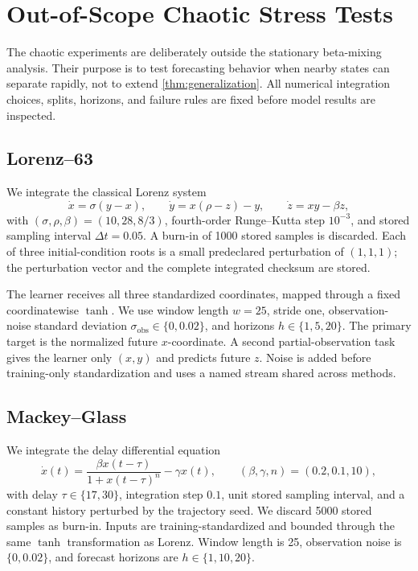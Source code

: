 \section{Out-of-Scope Chaotic Stress Tests}
\label{app:chaotic-stress}

The chaotic experiments are deliberately outside the stationary beta-mixing
analysis.  Their purpose is to test forecasting behavior when nearby states can
separate rapidly, not to extend \cref{thm:generalization}.  All numerical
integration choices, splits, horizons, and failure rules are fixed before
model results are inspected.

\subsection{Lorenz--63}
\label{app:lorenz63}

We integrate the classical Lorenz system \citep{Lorenz1963}
\begin{equation}
 \dot x=\sigma(y-x),\qquad
 \dot y=x(\rho-z)-y,\qquad
 \dot z=xy-\beta z,
 \label{eq:lorenz63}
\end{equation}
with \((\sigma,\rho,\beta)=(10,28,8/3)\), fourth-order Runge--Kutta step
\(10^{-3}\), and stored sampling interval \(\Delta t=0.05\).  A burn-in of
1000 stored samples is discarded.  Each of three initial-condition roots is a
small predeclared perturbation of \((1,1,1)\); the perturbation vector and the
complete integrated checksum are stored.

The learner receives all three standardized coordinates, mapped through a
fixed coordinatewise \(\tanh\).  We use window length \(w=25\), stride one,
observation-noise standard deviation \(\sigma_{\mathrm{obs}}\in\{0,0.02\}\),
and horizons \(h\in\{1,5,20\}\).  The primary target is the normalized future
\(x\)-coordinate.  A second partial-observation task gives the learner only
\((x,y)\) and predicts future \(z\).  Noise is added before training-only
standardization and uses a named stream shared across methods.

\subsection{Mackey--Glass}
\label{app:mackey-glass}

We integrate the delay differential equation \citep{MackeyGlass1977}
\begin{equation}
 \dot x(t)=\frac{\beta x(t-\tau)}{1+x(t-\tau)^n}-\gamma x(t),
 \qquad (\beta,\gamma,n)=(0.2,0.1,10),
 \label{eq:mackey-glass}
\end{equation}
with delay \(\tau\in\{17,30\}\), integration step \(0.1\), unit stored sampling
interval, and a constant history perturbed by the trajectory seed.  We discard
5000 stored samples as burn-in.  Inputs are training-standardized and bounded
through the same \(\tanh\) transformation as Lorenz.  Window length is 25,
observation noise is \(\{0,0.02\}\), and forecast horizons are
\(h\in\{1,10,20\}\).

